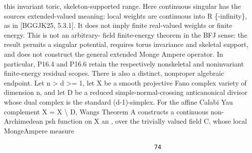 \documentclass[
  10pt,
]{article}
\begin{document}
this invariant toric, skeleton-supported range. Here continuous singular
has the sources extended-valued meaning: local weights are continuous
into R \{-infinity\}, as in {[}BGGJK25, 5.3.1{]}. It does not imply
finite real-valued weights or finite energy. This is not an arbitrary-
field finite-energy theorem in the BFJ sense: the result permits a
singular potential, requires torus invariance and skeletal support, and
does not construct the general extended Monge Ampere operator. In
particular, P16.4 and P16.6 retain the respectively nonskeletal and
noninvariant finite-energy residual scopes. There is also a distinct,
nonproper algebraic endpoint. Let n \textgreater{} d \textgreater= 1,
let X be a smooth projective Fano complex variety of dimension n, and
let D be a reduced simple-normal-crossing anticanonical divisor whose
dual complex is the standard (d-1)-simplex. For the affine Calabi Yau
complement X = X \textbackslash{} D, Wangs Theorem A constructs a
continuous non-Archimedean psh function on X an , over the trivially
valued field C, whose local MongeAmpere measure

\begin{verbatim}
                                           74
\end{verbatim}
\end{document}
